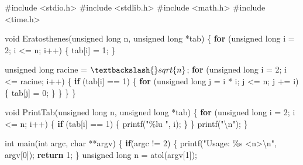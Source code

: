 \documentclass[
]{article}
\newenvironment{Shaded}{}{}
\newcommand{\ControlFlowTok}[1]{\textcolor[rgb]{0.00,0.44,0.13}{\textbf{#1}}}
\newcommand{\DataTypeTok}[1]{\textcolor[rgb]{0.56,0.13,0.00}{#1}}
\newcommand{\DecValTok}[1]{\textcolor[rgb]{0.25,0.63,0.44}{#1}}
\newcommand{\ImportTok}[1]{#1}
\newcommand{\NormalTok}[1]{#1}
\newcommand{\PreprocessorTok}[1]{\textcolor[rgb]{0.74,0.48,0.00}{#1}}
\newcommand{\SpecialCharTok}[1]{\textcolor[rgb]{0.25,0.44,0.63}{#1}}
\newcommand{\StringTok}[1]{\textcolor[rgb]{0.25,0.44,0.63}{#1}}
\begin{document}
\begin{Shaded}
\begin{Highlighting}[]
\PreprocessorTok{\#include }\ImportTok{\textless{}stdio.h\textgreater{}}
\PreprocessorTok{\#include }\ImportTok{\textless{}stdlib.h\textgreater{}}
\PreprocessorTok{\#include }\ImportTok{\textless{}math.h\textgreater{}}
\PreprocessorTok{\#include }\ImportTok{\textless{}time.h\textgreater{}}

\DataTypeTok{void}\NormalTok{ Eratosthenes(}\DataTypeTok{unsigned} \DataTypeTok{long}\NormalTok{ n, }\DataTypeTok{unsigned} \DataTypeTok{long}\NormalTok{ *tab) \{}
    \ControlFlowTok{for}\NormalTok{ (}\DataTypeTok{unsigned} \DataTypeTok{long}\NormalTok{ i = }\DecValTok{2}\NormalTok{; i \textless{}= n; i++) \{}
\NormalTok{        tab[i] = }\DecValTok{1}\NormalTok{;}
\NormalTok{    \}}

    \DataTypeTok{unsigned} \DataTypeTok{long}\NormalTok{ racine = $\textbackslash{}sqrt\{n\}$;}
    \ControlFlowTok{for}\NormalTok{ (}\DataTypeTok{unsigned} \DataTypeTok{long}\NormalTok{ i = }\DecValTok{2}\NormalTok{; i \textless{}= racine; i++) \{}
        \ControlFlowTok{if}\NormalTok{ (tab[i] == }\DecValTok{1}\NormalTok{) \{}
            \ControlFlowTok{for}\NormalTok{ (}\DataTypeTok{unsigned} \DataTypeTok{long}\NormalTok{ j = i * i; j \textless{}= n; j += i) \{}
\NormalTok{                tab[j] = }\DecValTok{0}\NormalTok{;}
\NormalTok{            \}}
\NormalTok{        \}}
\NormalTok{    \}}
\NormalTok{\}}

\DataTypeTok{void}\NormalTok{ PrintTab(}\DataTypeTok{unsigned} \DataTypeTok{long}\NormalTok{ n, }\DataTypeTok{unsigned} \DataTypeTok{long}\NormalTok{ *tab) \{}
    \ControlFlowTok{for}\NormalTok{ (}\DataTypeTok{unsigned} \DataTypeTok{long}\NormalTok{ i = }\DecValTok{2}\NormalTok{; i \textless{}= n; i++) \{}
        \ControlFlowTok{if}\NormalTok{ (tab[i] == }\DecValTok{1}\NormalTok{) \{}
\NormalTok{            printf(}\StringTok{"\%lu "}\NormalTok{, i);}
\NormalTok{        \}}
\NormalTok{    \}}
\NormalTok{    printf(}\StringTok{"}\SpecialCharTok{\textbackslash{}n}\StringTok{"}\NormalTok{);}
\NormalTok{\}}

\DataTypeTok{int}\NormalTok{ main(}\DataTypeTok{int}\NormalTok{ argc, }\DataTypeTok{char}\NormalTok{ **argv) \{}
    \ControlFlowTok{if}\NormalTok{(argc != }\DecValTok{2}\NormalTok{) \{}
\NormalTok{        printf(}\StringTok{"Usage: \%s \textless{}n\textgreater{}}\SpecialCharTok{\textbackslash{}n}\StringTok{"}\NormalTok{, argv[}\DecValTok{0}\NormalTok{]);}
        \ControlFlowTok{return} \DecValTok{1}\NormalTok{;}
\NormalTok{    \}}
    \DataTypeTok{unsigned} \DataTypeTok{long}\NormalTok{ n = atol(argv[}\DecValTok{1}\NormalTok{]);}


\end{Highlighting}
\end{Shaded}
\end{document}

